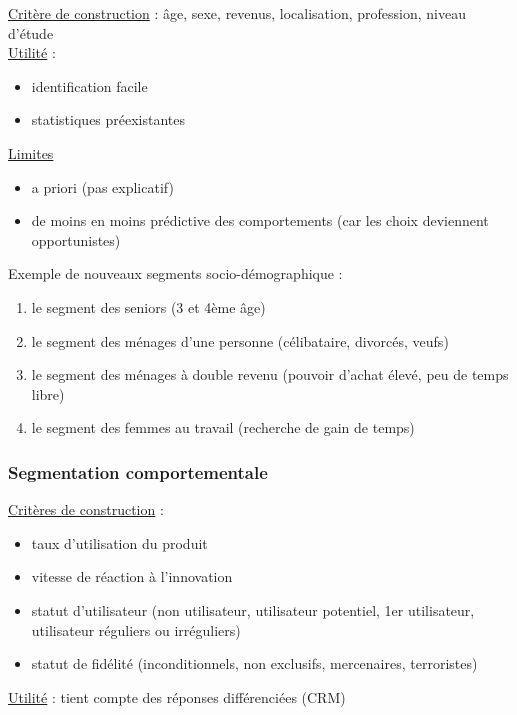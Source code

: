 			\underline{Critère de construction} : âge, sexe, revenus, localisation, profession, niveau d'étude \\
				
			\underline{Utilité} : 
			\begin{itemize}
				\item identification facile
				\item statistiques préexistantes
			\end{itemize}
				\n
			\underline{Limites}
			\begin{itemize}
				\item a priori (pas explicatif)
				\item de moins en moins prédictive des comportements (car les choix deviennent opportunistes)
			\end{itemize}
			\n	
				
				
			Exemple de nouveaux segments socio-démographique :
				
			\begin{enumerate}
				\item le segment des seniors (3 et 4ème âge)
				\item le segment des ménages d'une personne (célibataire, divorcés, veufs)
				\item le segment des ménages à double revenu (pouvoir d'achat élevé, peu de temps libre)
				\item le segment des femmes au travail (recherche de gain de temps)
			\end{enumerate}
				
				
					
			\subsubsection{Segmentation comportementale}			
				
			\underline{Critères de construction} : 
				
			\begin{itemize}
				\item taux d'utilisation du produit
				\item vitesse de réaction à l'innovation 
				\item statut d'utilisateur (non utilisateur, utilisateur potentiel, 1er utilisateur, utilisateur réguliers ou irréguliers)
				\item statut de fidélité (inconditionnels, non exclusifs, mercenaires, terroristes)
			\end{itemize}
				\n
			\underline{Utilité} : tient compte des réponses différenciées (CRM) \\
				
